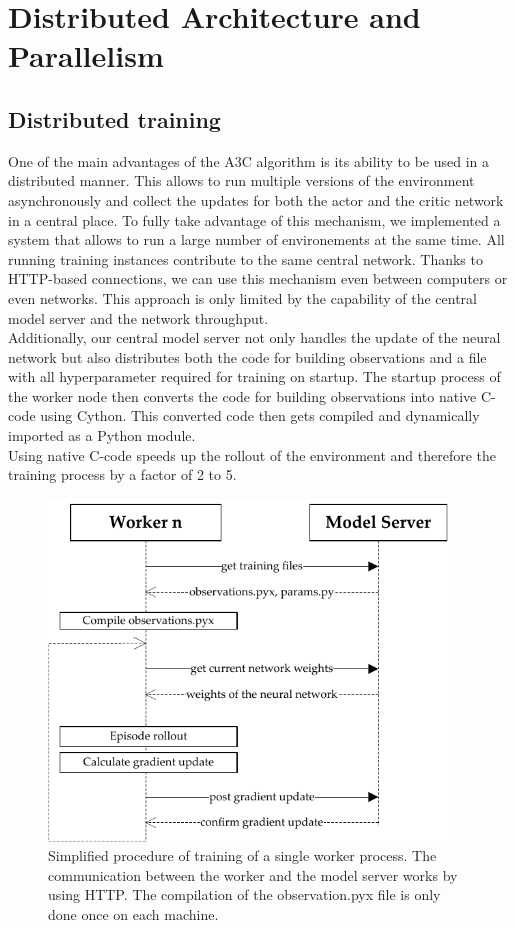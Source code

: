 \section[Distributed Training]{Distributed Architecture and Parallelism}\label{dist_architecture}
\subsection*{Distributed training}
One of the main advantages of the A3C algorithm is its ability to be used in a distributed manner. This allows to run multiple versions of the environment asynchronously and collect the updates for both the actor and the critic network in a central place. To fully take advantage of this mechanism, we implemented a system that allows to run a large number of environements at the same time. All running training instances contribute to the same central network. Thanks to HTTP-based connections, we can use this mechanism even between computers or even networks. This approach is only limited by the capability of the central model server and the network throughput.\\
Additionally, our central model server not only handles the update of the neural network but also distributes both the code for building observations and a file with all hyperparameter required for training on startup. The startup process of the worker node then converts the code for building observations into native C-code using Cython. This converted code then gets compiled and dynamically imported as a Python module.\\
Using native C-code speeds up the rollout of the environment and therefore the training process by a factor of 2 to 5.
\begin{figure}[H]
	\centering
	\includegraphics[width=300pt]{diagrams/distributed_training_update.pdf}
	\caption{Simplified procedure of training of a single worker process. The communication between the worker and the model server works by using HTTP. The compilation of the observation.pyx file is only done once on each machine.}
	\label{obs_descr}
\end{figure}

